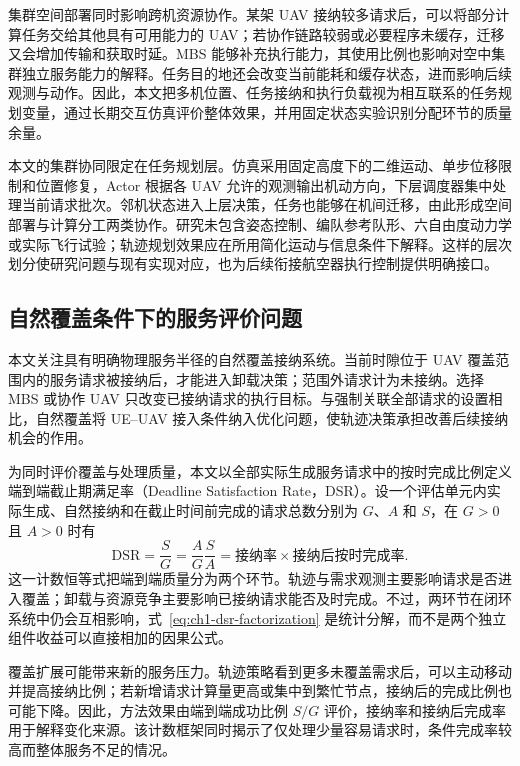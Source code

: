 集群空间部署同时影响跨机资源协作。某架 UAV 接纳较多请求后，可以将部分计算任务交给其他具有可用能力的 UAV；若协作链路较弱或必要程序未缓存，迁移又会增加传输和获取时延。MBS 能够补充执行能力，其使用比例也影响对空中集群独立服务能力的解释。任务目的地还会改变当前能耗和缓存状态，进而影响后续观测与动作。因此，本文把多机位置、任务接纳和执行负载视为相互联系的任务规划变量，通过长期交互仿真评价整体效果，并用固定状态实验识别分配环节的质量余量。

本文的集群协同限定在任务规划层。仿真采用固定高度下的二维运动、单步位移限制和位置修复，Actor 根据各 UAV 允许的观测输出机动方向，下层调度器集中处理当前请求批次。邻机状态进入上层决策，任务也能够在机间迁移，由此形成空间部署与计算分工两类协作。研究未包含姿态控制、编队参考队形、六自由度动力学或实际飞行试验；轨迹规划效果应在所用简化运动与信息条件下解释。这样的层次划分使研究问题与现有实现对应，也为后续衔接航空器执行控制提供明确接口。

\subsection{自然覆盖条件下的服务评价问题}
\label{sec:ch1-natural-admission}

本文关注具有明确物理服务半径的自然覆盖接纳系统。当前时隙位于 UAV 覆盖范围内的服务请求被接纳后，才能进入卸载决策；范围外请求计为未接纳。选择 MBS 或协作 UAV 只改变已接纳请求的执行目标。与强制关联全部请求的设置相比，自然覆盖将 UE--UAV 接入条件纳入优化问题，使轨迹决策承担改善后续接纳机会的作用。

为同时评价覆盖与处理质量，本文以全部实际生成服务请求中的按时完成比例定义端到端截止期满足率（Deadline Satisfaction Rate，DSR）。设一个评估单元内实际生成、自然接纳和在截止时间前完成的请求总数分别为 $G$、$A$ 和 $S$，在 $G>0$ 且 $A>0$ 时有
\begin{equation}
    \mathrm{DSR}=\frac{S}{G}
    =\frac{A}{G}\frac{S}{A}
    =\text{接纳率}\times\text{接纳后按时完成率}.
    \label{eq:ch1-dsr-factorization}
\end{equation}
这一计数恒等式把端到端质量分为两个环节。轨迹与需求观测主要影响请求是否进入覆盖；卸载与资源竞争主要影响已接纳请求能否及时完成。不过，两环节在闭环系统中仍会互相影响，式~\eqref{eq:ch1-dsr-factorization} 是统计分解，而不是两个独立组件收益可以直接相加的因果公式。

覆盖扩展可能带来新的服务压力。轨迹策略看到更多未覆盖需求后，可以主动移动并提高接纳比例；若新增请求计算量更高或集中到繁忙节点，接纳后的完成比例也可能下降。因此，方法效果由端到端成功比例 $S/G$ 评价，接纳率和接纳后完成率用于解释变化来源。该计数框架同时揭示了仅处理少量容易请求时，条件完成率较高而整体服务不足的情况。

